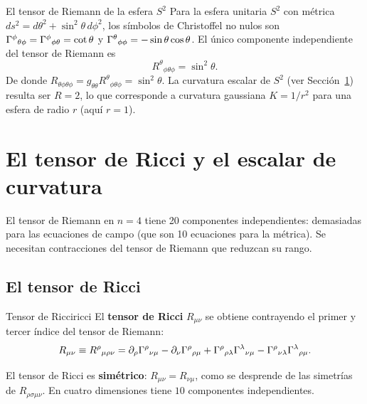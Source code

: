 \begin{ejemplo}{El tensor de Riemann de la esfera $S^2$}{}
Para la esfera unitaria $S^2$ con métrica $ds^2 = d\theta^2 + \sin^2\theta\, d\phi^2$, los símbolos de Christoffel no nulos son $\Gamma^{\phi}{}_{\theta \phi} = \Gamma^{\phi}{}_{\phi \theta} = \cot\theta$ y $\Gamma^{\theta}{}_{\phi \phi} = -\sin\theta\cos\theta$. El único componente independiente del tensor de Riemann es
\[
  R^\theta{}_{\phi\theta\phi} = \sin^2\theta.
\]
De donde $R_{\theta\phi\theta\phi} = g_{\theta\theta} R^\theta{}_{\phi\theta\phi} = \sin^2\theta$. La curvatura escalar de $S^2$ (ver Sección~\ref{sec:ricci}) resulta ser $R = 2$, lo que corresponde a curvatura gaussiana $K = 1/r^2$ para una esfera de radio $r$ (aquí $r=1$).
\end{ejemplo}

\section{El tensor de Ricci y el escalar de curvatura}
\label{sec:ricci}

El tensor de Riemann en $n=4$ tiene 20 componentes independientes: demasiadas para las ecuaciones de campo (que son 10 ecuaciones para la métrica). Se necesitan contracciones del tensor de Riemann que reduzcan su rango.

\subsection{El tensor de Ricci}

\begin{definicion}{Tensor de Ricci}{ricci}
El \textbf{tensor de Ricci} $R_{\mu\nu}$ se obtiene contrayendo el primer y tercer índice del tensor de Riemann:
\begin{equation}
  R_{\mu\nu} \equiv R^\rho{}_{\mu\rho\nu}
  = \partial_\rho\Gamma^{\rho}{}_{\nu \mu} - \partial_\nu\Gamma^{\rho}{}_{\rho \mu}
    + \Gamma^{\rho}{}_{\rho \lambda}\Gamma^{\lambda}{}_{\nu \mu}
    - \Gamma^{\rho}{}_{\nu \lambda}\Gamma^{\lambda}{}_{\rho \mu}.
  \label{eq:ricci_def}
\end{equation}
\end{definicion}

El tensor de Ricci es \textbf{simétrico}: $R_{\mu\nu} = R_{\nu\mu}$, como se desprende de las simetrías de $R_{\rho\sigma\mu\nu}$. En cuatro dimensiones tiene $10$ componentes independientes.

